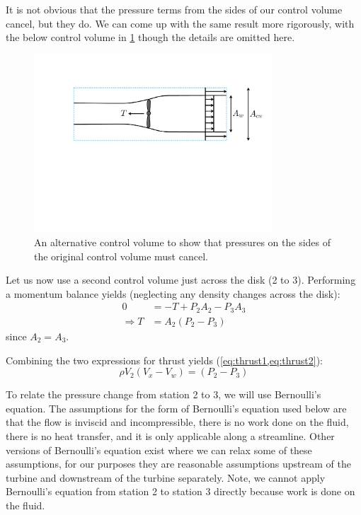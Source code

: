 \documentclass{article}
\begin{document}
It is not obvious that the pressure terms from the sides of our control volume cancel, but they do.  We can come up with the same result more rigorously, with the below control volume in \cref{fig:turbine-cv} though the details are omitted here.

\begin{figure}[htbp]
\centering
\includegraphics[width=3.5in]{figures/turbine-cv}
\caption{An alternative control volume to show that pressures on the sides of the original control volume must cancel.}
\label{fig:turbine-cv}
\end{figure}

Let us now use a second control volume just across the disk (2 to 3).  Performing a momentum balance yields (neglecting any density changes across the disk):
\begin{equation}
\begin{aligned}
    0 &= - T + P_2 A_2 - P_3 A_3\\
    \Rightarrow T &= A_2 (P_2 - P_3)
\end{aligned}
\label{eq:thrust2}
\end{equation}
since $A_2 = A_3$.

Combining the two expressions for thrust yields (\cref{eq:thrust1,eq:thrust2}):
\begin{equation}
    \rho V_2 (V_x - V_w) = (P_2 - P_3)
    \label{eq:momentum1}
\end{equation}

To relate the pressure change from station 2 to 3, we will use Bernoulli's equation.  The assumptions for the form of Bernoulli's equation used below are that the flow is inviscid and incompressible, there is no work done on the fluid, there is no heat transfer, and it is only applicable along a streamline.  Other versions of Bernoulli's equation exist where we can relax some of these assumptions, for our purposes they are reasonable assumptions upstream of the turbine and downstream of the turbine separately.  Note, we cannot apply Bernoulli's equation from station 2 to station 3 directly because work is done on the fluid.
\end{document}
